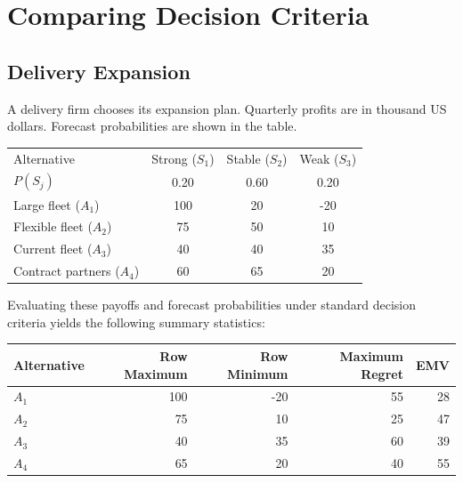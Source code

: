 \section{Comparing Decision Criteria}\label{sec:c8-comparing}

\subsection{Delivery Expansion}\label{sec:c8-worked}
A delivery firm chooses its expansion plan. Quarterly profits are in thousand US dollars. Forecast probabilities are shown in the table.
\begin{center}
\begin{tabular}{lccc}\toprule
Alternative & Strong ($S_1$) & Stable ($S_2$) & Weak ($S_3$)\\
$P(S_j)$ & 0.20 & 0.60 & 0.20\\\midrule
Large fleet ($A_1$) & 100 & 20 & -20\\
Flexible fleet ($A_2$) & 75 & 50 & 10\\
Current fleet ($A_3$) & 40 & 40 & 35\\
Contract partners ($A_4$) & 60 & 65 & 20\\\bottomrule
\end{tabular}
\end{center}
Evaluating these payoffs and forecast probabilities under standard decision criteria yields the following summary statistics:
\begin{center}
\begin{tabular}{lrrrr}\toprule
Alternative & Row Maximum & Row Minimum & Maximum Regret & EMV\\\midrule
$A_1$ & 100 & -20 & 55 & 28\\
$A_2$ & 75 & 10 & 25 & 47\\
$A_3$ & 40 & 35 & 60 & 39\\
$A_4$ & 65 & 20 & 40 & 55\\\bottomrule
\end{tabular}
\end{center}

